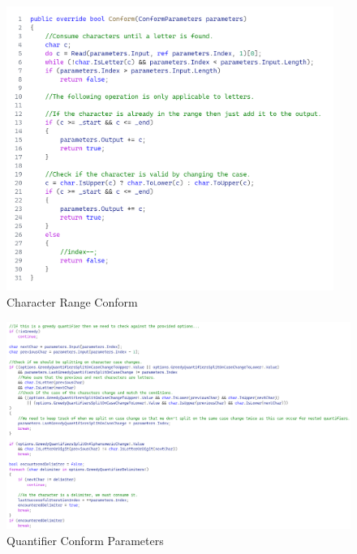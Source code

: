 \begin{figure}
{\begin{minipage}[t]{0.6\linewidth}
\begin{subfigure}[b]{0.9\linewidth}
        \end{subfigure}
    \end{minipage}
    \begin{minipage}[t]{0.6\linewidth}
        \centering
        \caption{Character Range Conform}
        \label{fig:CharacterRangeConform}
        \includegraphics[width=0.95\textwidth]{Figures/CharacterRangeConform.png}
    \end{minipage}
}
\end{figure}

\begin{figure}[htp]
    \centering
    \caption{Quantifier Conform Parameters}
    \label{fig:QuantifierConformParameters}
    \includegraphics[width=1.0\textwidth]{Figures/QuantifierConformParameters.png}
\end{figure}

